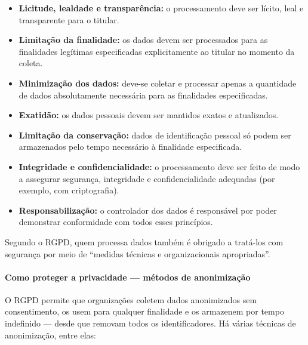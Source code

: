 \documentclass[
  11pt,
]{article}
\providecommand{\tightlist}{%
  \setlength{\itemsep}{0pt}\setlength{\parskip}{0pt}}
\begin{document}
\begin{itemize}
\tightlist
\item
  \textbf{Licitude, lealdade e transparência:} o processamento deve ser
  lícito, leal e transparente para o titular.
\item
  \textbf{Limitação da finalidade:} os dados devem ser processados para
  as finalidades legítimas especificadas explicitamente ao titular no
  momento da coleta.
\item
  \textbf{Minimização dos dados:} deve-se coletar e processar apenas a
  quantidade de dados absolutamente necessária para as finalidades
  especificadas.
\item
  \textbf{Exatidão:} os dados pessoais devem ser mantidos exatos e
  atualizados.
\item
  \textbf{Limitação da conservação:} dados de identificação pessoal só
  podem ser armazenados pelo tempo necessário à finalidade especificada.
\item
  \textbf{Integridade e confidencialidade:} o processamento deve ser
  feito de modo a assegurar segurança, integridade e confidencialidade
  adequadas (por exemplo, com criptografia).
\item
  \textbf{Responsabilização:} o controlador dos dados é responsável por
  poder demonstrar conformidade com todos esses princípios.
\end{itemize}

Segundo o RGPD, quem processa dados também é obrigado a tratá-los com
segurança por meio de ``medidas técnicas e organizacionais
apropriadas''.

\paragraph{Como proteger a privacidade --- métodos de
anonimização}\label{como-proteger-a-privacidade-muxe9todos-de-anonimizauxe7uxe3o}

O RGPD permite que organizações coletem dados anonimizados sem
consentimento, os usem para qualquer finalidade e os armazenem por tempo
indefinido --- desde que removam todos os identificadores. Há várias
técnicas de anonimização, entre elas:
\end{document}

